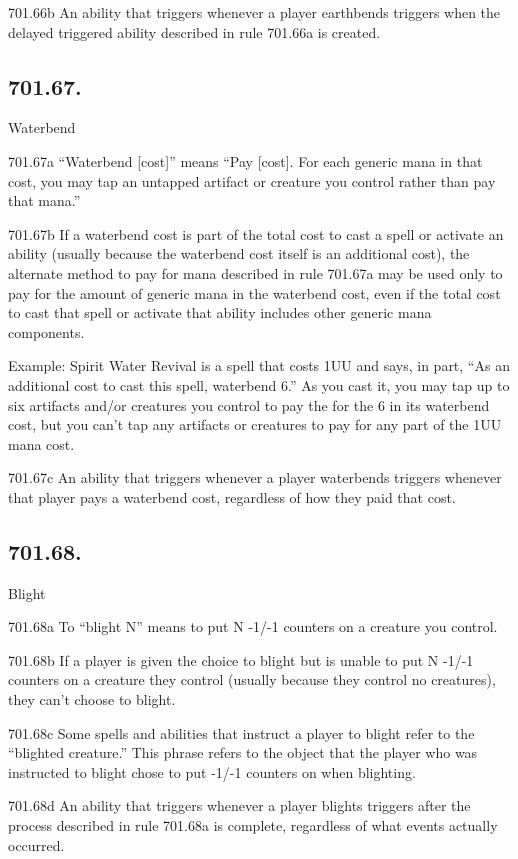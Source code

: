 701.66b An ability that triggers whenever a player earthbends triggers when the delayed triggered ability described in rule 701.66a is created.

\subsection*{701.67.}
Waterbend

701.67a “Waterbend [cost]” means “Pay [cost]. For each generic mana in that cost, you may tap an untapped artifact or creature you control rather than pay that mana.”

701.67b If a waterbend cost is part of the total cost to cast a spell or activate an ability (usually because the waterbend cost itself is an additional cost), the alternate method to pay for mana described in rule 701.67a may be used only to pay for the amount of generic mana in the waterbend cost, even if the total cost to cast that spell or activate that ability includes other generic mana components.

Example: Spirit Water Revival is a spell that costs {1}{U}{U} and says, in part, “As an additional cost to cast this spell, waterbend {6}.” As you cast it, you may tap up to six artifacts and/or creatures you control to pay the for the {6} in its waterbend cost, but you can’t tap any artifacts or creatures to pay for any part of the {1}{U}{U} mana cost.

701.67c An ability that triggers whenever a player waterbends triggers whenever that player pays a waterbend cost, regardless of how they paid that cost.

\subsection*{701.68.}
Blight

701.68a To “blight N” means to put N -1/-1 counters on a creature you control.

701.68b If a player is given the choice to blight but is unable to put N -1/-1 counters on a creature they control (usually because they control no creatures), they can’t choose to blight.

701.68c Some spells and abilities that instruct a player to blight refer to the “blighted creature.” This phrase refers to the object that the player who was instructed to blight chose to put -1/-1 counters on when blighting.

701.68d An ability that triggers whenever a player blights triggers after the process described in rule 701.68a is complete, regardless of what events actually occurred.

